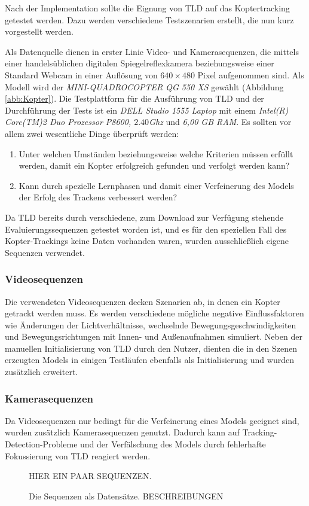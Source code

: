 Nach der Implementation sollte die Eignung von TLD auf das Koptertracking getestet werden. Dazu werden verschiedene Testszenarien erstellt, die nun kurz vorgestellt werden.

Als Datenquelle dienen in erster Linie Video- und Kamerasequenzen, die mittels einer handelsüblichen digitalen Spiegelreflexkamera beziehungsweise einer Standard Webcam in einer Auflösung von $640\times480$ Pixel aufgenommen sind. Als Modell wird der \textit{MINI-QUADROCOPTER QG 550 XS} gewählt (Abbildung \ref{abb:Kopter}). Die Testplattform für die Ausführung von TLD und der Durchführung der Tests ist ein \textit{DELL Studio 1555 Laptop} mit einem \textit{Intel(R) Core(TM)2 Duo Prozessor P8600, $2.40$Ghz} und \textit{6,00 GB RAM}. Es sollten vor allem zwei wesentliche Dinge überprüft werden:

\begin{enumerate}
\item Unter welchen Umständen beziehungsweise welche Kriterien müssen erfüllt werden, damit ein Kopter erfolgreich gefunden und verfolgt werden kann?
\item Kann durch spezielle Lernphasen und damit einer Verfeinerung des Models der Erfolg des Trackens verbessert werden?
\end{enumerate}

Da TLD bereits durch verschiedene, zum Download zur Verfügung stehende Evaluierungssequenzen getestet worden ist, und es für den speziellen Fall des Kopter-Trackings keine Daten vorhanden waren, wurden ausschließlich eigene Sequenzen verwendet.

\subsubsection{Videosequenzen}
Die verwendeten Videosequenzen decken Szenarien ab, in denen ein Kopter getrackt werden muss. Es werden verschiedene mögliche negative Einflussfaktoren wie Änderungen der Lichtverhältnisse, wechselnde Bewegungsgeschwindigkeiten und Bewegungsrichtungen mit Innen- und Außenaufnahmen simuliert. Neben der manuellen Initialisierung von TLD durch den Nutzer, dienten die in den Szenen erzeugten Models in einigen Testläufen ebenfalls als Initialisierung und wurden zusätzlich erweitert.

\subsubsection{Kamerasequenzen}
Da Videosequenzen nur bedingt für die Verfeinerung eines Models geeignet sind, wurden zusätzlich Kamerasequenzen genutzt. Dadurch kann auf Tracking-Detection-Probleme und der Verfälschung des Models durch fehlerhafte Fokussierung von TLD reagiert werden.

\begin{figure}[H]
  \begin{centering}
    HIER EIN PAAR SEQUENZEN.
    \caption{Die Sequenzen als Datensätze. BESCHREIBUNGEN}
    \label{abb:sequenzen}
    \par
  \end{centering}
\end{figure}